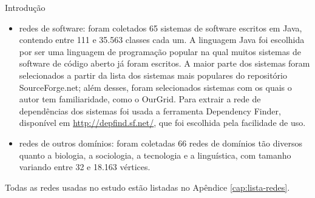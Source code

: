 \begin{section}{Introdução}
\begin{itemize}
	\item redes de software: foram coletados 65 sistemas de software escritos em Java, contendo entre 111 e 35.563 classes cada um. A linguagem Java foi escolhida por ser uma linguagem de programação popular na qual muitos sistemas de software de código aberto já foram escritos. A maior parte dos sistemas foram selecionados a partir da lista dos sistemas mais populares do repositório SourceForge.net; além desses, foram selecionados sistemas com os quais o autor tem familiaridade, como o OurGrid. Para extrair a rede de dependências dos sistemas foi usada a ferramenta Dependency Finder, disponível em \url{http://depfind.sf.net/}, que foi escolhida pela facilidade de uso.
	\item redes de outros domínios: foram coletadas 66 redes de domínios tão diversos quanto a biologia, a sociologia, a tecnologia e a linguística, com tamanho variando entre 32 e 18.163 vértices.
\end{itemize}

Todas as redes usadas no estudo estão listadas no Apêndice \ref{cap:lista-redes}.

\end{section}

